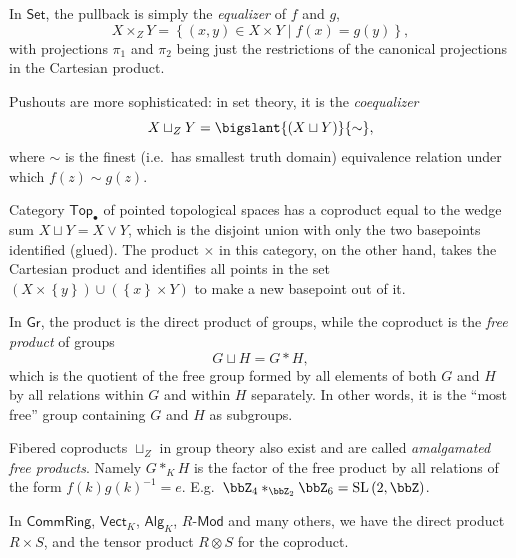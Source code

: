 %
\begin{example}\label{pullbacks in Set}
In $\mathsf{Set}$, the pullback is simply the \emph{equalizer}
of $f$ and $g$, 
\[
X\times_{Z}Y=\left\{ \left(x,y\right)\in X\times Y\mid f(x)=g(y)\right\} ,
\]
with projections $\pi_{1}$ and $\pi_{2}$ being just the restrictions
of the canonical projections in the Cartesian product.

Pushouts are more sophisticated: in set theory, it is the \emph{coequalizer}
\[
X\sqcup_{Z}Y=\bigslant{\left(X\sqcup Y\right)}{\sim},
\]
where $\sim$ is the finest (i.e.\ has smallest truth domain) equivalence
relation under which $f(z)\sim g(z)$.
\end{example}
%
\begin{example}
Category $\mathsf{Top}_{\bullet}$ of pointed topological spaces has
a coproduct equal to the wedge sum $X\sqcup Y=X\vee Y$, which is
the disjoint union with only the two basepoints identified (glued).
The product $\times$ in this category, on the other hand, takes the
Cartesian product and identifies all points in the set $\left(X\times\left\{ y\right\} \right)\cup\left(\left\{ x\right\} \times Y\right)$
to make a new basepoint out of it.
\end{example}
%
\begin{example}\label{pushouts in groups}
In $\mathsf{Gr}$, the product is the direct product of groups, while
the coproduct is the \emph{free product} of groups 
\[
G\sqcup H=G\ast H,
\]
which is the quotient of the free group formed by all elements of
both $G$ and $H$ by all relations within $G$ and within $H$ separately.
In other words, it is the ``most free'' group containing $G$ and
$H$ as subgroups. 

Fibered coproducts $\sqcup_{Z}$ in group theory also exist and are
called \emph{amalgamated free products}. Namely $G\ast_K H$ is the factor of the free product by all relations of the form $f(k)g(k)^{-1}=e$. E.g.\ $\bbZ_{4}\ast_{\bbZ_{2}}\bbZ_{6}=\mathrm{SL}\left(2,\bbZ\right)$.
\end{example}
%
\begin{example}
In $\mathsf{CommRing}$, $\mathsf{Vect}_{K}$, $\mathsf{Alg}_{K}$,
$R\text{-}\mathsf{Mod}$ and many others, we have the direct product
$R\times S$, and the tensor product $R\otimes S$ for the coproduct.
\end{example}


